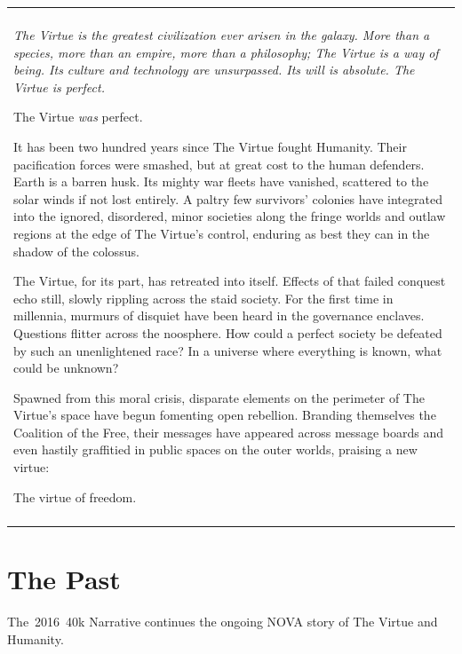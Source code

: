 \documentclass{novanarrative}
\begin{document}
\bigskip
\begin{center}  
\begin{tabular}{L{6in}}
  \hline\\
  {\it
  The Virtue is the greatest civilization ever arisen in the galaxy.
  More than a species, more than an empire, more than a philosophy; The
  Virtue is a way of being.  Its culture and technology
  are unsurpassed.  Its will is absolute.  The Virtue is perfect.

  \bigskip
  The Virtue \emph{was} perfect.

  \bigskip
  It has been two hundred years since The Virtue fought Humanity.  Their
  pacification forces were smashed, but at great cost to the human
  defenders.  Earth is a barren husk.  Its mighty war fleets have
  vanished, scattered to the solar winds if not lost entirely.  A paltry
  few survivors' colonies have integrated into the ignored, disordered, minor
  societies along the fringe worlds and outlaw regions at the edge of The Virtue's control,
  enduring as best they can
  in the shadow of the colossus.

  \smallskip
  The Virtue, for its part, has retreated into itself.  Effects of that
  failed conquest echo still, slowly rippling across the staid society.
  For the first time in millennia, murmurs of disquiet have been heard
  in the governance enclaves.  Questions flitter across the noosphere.
  How could a perfect society be defeated by such an unenlightened race?
  In a universe where everything is known, what could be unknown?

  \smallskip
  Spawned from this moral crisis, disparate elements on the perimeter of
  The Virtue's space have begun fomenting open rebellion.  Branding themselves
  the Coalition of the Free, their messages have appeared across
  message boards and even hastily graffitied in public spaces on the
  outer worlds, praising a new virtue:

  \bigskip
  \centerline{The virtue of freedom.}
  }
  \\
  \hline\\
\end{tabular}
\end{center}

\section{The Past}

The~2016~40k Narrative continues the ongoing NOVA story of The Virtue
and Humanity.
\end{document}
